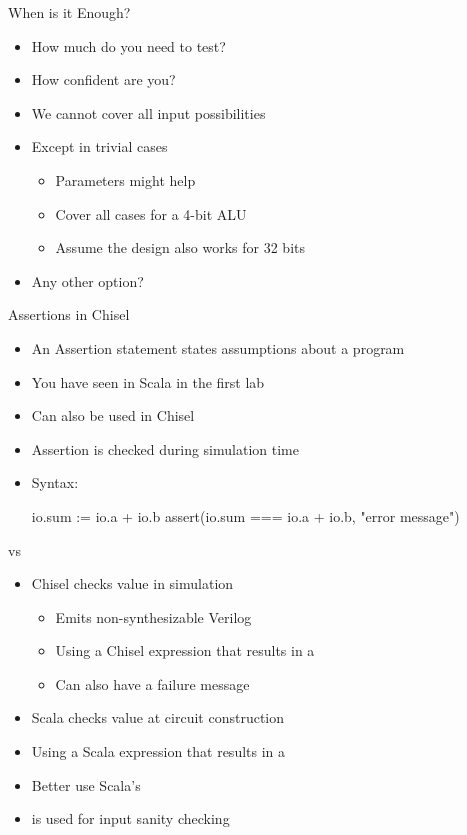 \begin{frame}[fragile]{When is it Enough?}
\begin{itemize}
\item How much do you need to test?
\item How confident are you?
\item We cannot cover all input possibilities
\item Except in trivial cases
\begin{itemize}
\item Parameters might help
\item Cover all cases for a 4-bit ALU
\item Assume the design also works for 32 bits 
\end{itemize}
\item Any other option?
\end{itemize}
\end{frame}

\begin{frame}[fragile]{Assertions in Chisel}
\begin{itemize}
\item An Assertion statement states assumptions about a program
\item You have seen  in Scala in the first lab
\item Can also be used in Chisel
\item Assertion is checked during simulation time
\item Syntax:
\begin{chisel}
  io.sum := io.a + io.b
  assert(io.sum === io.a + io.b, "error message")
\end{chisel}
\end{itemize}
\end{frame}

\begin{frame}[fragile]{ vs }
\begin{itemize}
\item Chisel  checks value in simulation
\begin{itemize}
\item Emits non-synthesizable Verilog
\item Using a Chisel expression that results in a 
\item Can also have a failure message
\end{itemize}
\item Scala  checks value at circuit construction
\item Using a Scala expression that results in a 
\item Better use Scala's 
\item {} is used for input sanity checking
\end{itemize}
\end{frame}


